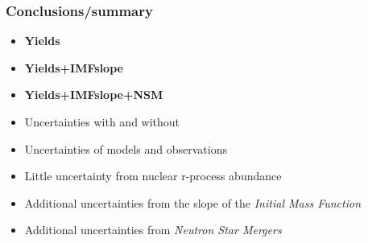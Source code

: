 \begin{frame}
  \frametitle{Conclusions/summary}
  \begin{minipage}{0.65\linewidth}
    \begin{itemize}
    \item \textbf{Yields}
    \item \textbf{Yields+IMFslope} 
    \item \textbf{Yields+IMFslope+NSM}
    \end{itemize}
    \vfill
    \begin{itemize}
    \item Uncertainties with and without \betadecay
    \item Uncertainties of models and observations
    \item Little uncertainty from nuclear r-process abundance
    \item Additional uncertainties from the slope of the \textit{Initial Mass Function}
    \item Additional uncertainties from \textit{Neutron Star Mergers}
    \end{itemize}
  \end{minipage}
\end{frame}
